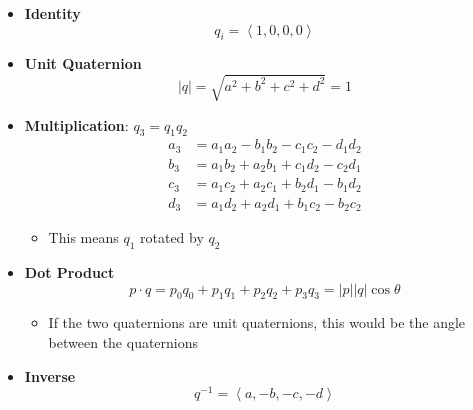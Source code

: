   \begin{itemize}
    \item \textbf{Identity}
    \begin{equation}
      q_{i} = \left< 1, 0, 0, 0 \right>
    \end{equation}

    \item \textbf{Unit Quaternion}
    \begin{equation}
      \left| q \right| = \sqrt{a^{2} + b^{2} + c^{2} + d^{2}} = 1
    \end{equation}

    \item \textbf{Multiplication}: $ q_{3} = q_{1} q_{2} $
    \begin{equation}
      \begin{split}
        a_{3} &= a_{1} a_{2} - b_{1} b_{2} - c_{1} c_{2} - d_{1} d_{2} \\
        b_{3} &= a_{1} b_{2} + a_{2} b_{1} + c_{1} d_{2} - c_{2} d_{1} \\
        c_{3} &= a_{1} c_{2} + a_{2} c_{1} + b_{2} d_{1} - b_{1} d_{2} \\
        d_{3} &= a_{1} d_{2} + a_{2} d_{1} + b_{1} c_{2} - b_{2} c_{2}
      \end{split}
    \end{equation}

    \begin{itemize}
      \item This means $ q_{1} $ rotated by $ q_{2} $
    \end{itemize}

    \item \textbf{Dot Product}
    \begin{equation}
      p \cdot q = p_{0} q_{0} + p_{1} q_{1} + p_{2} q_{2} + p_{3} q_{3}
      = \left| p \right| \left| q \right| \cos \theta
    \end{equation}

    \begin{itemize}
      \item If the two quaternions are unit quaternions, this would be the
      angle between the quaternions
    \end{itemize}

    \item \textbf{Inverse}
    \begin{equation}
      q^{-1} = \left< a, -b, -c, -d \right>
    \end{equation}


\end{itemize}
